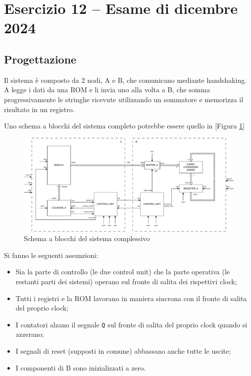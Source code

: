 \section{Esercizio 12 -- Esame di dicembre 2024}
\subsection{Progettazione}
Il sistema è composto da 2 nodi, A e B, che comunicano mediante handshaking. A legge i dati da una ROM e li invia uno alla volta a B, che somma progressivamente le stringhe ricevute utilizzando un sommatore e memorizza il risultato in un registro.

Uno schema a blocchi del sistema completo potrebbe essere quello in [Figura \ref{fig_december_exam_block_diagram}]

\begin{figure}[h]
    \centering
    \includegraphics[width=\linewidth]{img/december_exam_block_diagram.pdf}
    \caption{Schema a blocchi del sistema complessivo}
    \label{fig_december_exam_block_diagram}
\end{figure}

Si fanno le seguenti assunzioni:

\begin{itemize}
    \item Sia la parte di controllo (le due control unit) che la parte operativa (le restanti parti dei sistemi) operano sul fronte di salita dei rispettivi clock;
    \item Tutti i registri e la ROM lavorano in maniera sincrona con il fronte di salita del proprio clock;
    \item I contatori alzano il segnale \texttt{Q} sul fronte di salita del proprio clock quando si azzerano;
    \item I segnali di reset (supposti in comune) abbassano anche tutte le uscite;
    \item I componenti di B sono inizializzati a zero.
\end{itemize}


